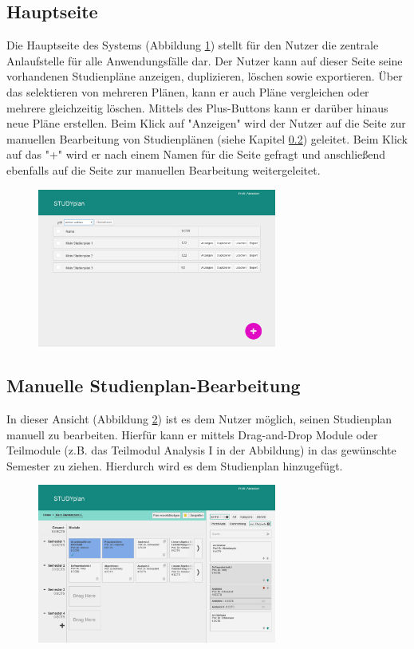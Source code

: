 \subsection{Hauptseite}
\label{subsec:gui-hauptseite}
Die Hauptseite des Systems (Abbildung \ref{fig:gui-hauptseite-1}) stellt für den Nutzer die zentrale Anlaufstelle für alle Anwendungsfälle dar. Der Nutzer kann auf dieser Seite seine vorhandenen Studienpläne anzeigen, duplizieren, löschen sowie exportieren. Über das selektieren von mehreren Plänen, kann er auch Pläne vergleichen oder mehrere gleichzeitig löschen. Mittels des Plus-Buttons kann er darüber hinaus neue Pläne erstellen.\newline
Beim Klick auf "Anzeigen" wird der Nutzer auf die Seite zur manuellen Bearbeitung von Studienplänen (siehe Kapitel \ref{subsec:gui-manuelle-bearbeitung}) geleitet. Beim Klick auf das "+" wird er nach einem Namen für die Seite gefragt und anschließend ebenfalls auf die Seite zur manuellen Bearbeitung weitergeleitet.
\begin{figure}[!htb]
	\caption{}
	\label{fig:gui-hauptseite-1}
	\centering
	\includegraphics[width=0.7\textwidth]{../GUI/ergebnisse/hauptseite-1.png}
\end{figure}

\subsection{Manuelle Studienplan-Bearbeitung}
\label{subsec:gui-manuelle-bearbeitung}
In dieser Ansicht (Abbildung \ref{fig:gui-bearbeitung-1}) ist es dem Nutzer möglich, seinen Studienplan manuell zu bearbeiten. Hierfür kann er mittels Drag-and-Drop Module oder Teilmodule (z.B. das Teilmodul Analysis I in der Abbildung) in das gewünschte Semester zu ziehen. Hierdurch wird es dem Studienplan hinzugefügt.
\begin{figure}[!htb]
	\caption{}
	\label{fig:gui-bearbeitung-1}
	\centering
	\includegraphics[width=0.7\textwidth]{../GUI/ergebnisse/bearbeitung-1.png}
\end{figure}

